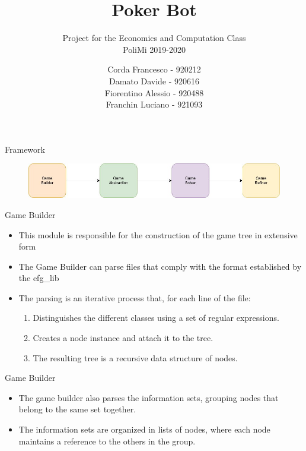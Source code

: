 \documentclass[11pt]{beamer}
\author{Corda Francesco - 920212\\
		Damato Davide - 920616\\
		Fiorentino Alessio - 920488\\
		Franchin Luciano - 921093}
\title{Poker Bot}
\subtitle{Project for the Economics and Computation Class\\
		PoliMi 2019-2020}
\begin{document}
\begin{frame}
\titlepage
\end{frame}


\begin{frame}{Framework}
\begin{figure}[hbtp]
		\centering
		\includegraphics[scale=0.5]{images/img_01.jpg}
		\end{figure}
\end{frame}

\begin{frame}{Game Builder}
\begin{itemize}
\item This module is responsible for the construction of the game tree in extensive form
\item The Game Builder can parse files that comply with the format established by the efg\_lib
\item The parsing is an iterative process that, for each line of the file:
\begin{enumerate}
\item Distinguishes the different classes using a set of regular expressions.
\item Creates a node instance and attach it to the tree.
\item The resulting tree is a recursive data structure of nodes.
\end{enumerate}
\end{itemize}
\end{frame}

\begin{frame}{Game Builder}
\begin{itemize}
\item The game builder also parses the information sets, grouping nodes that belong to the same set together.
\item The information sets are organized in lists of nodes, where each node maintains a reference to the others in the group.
\end{itemize}
\end{frame}
\end{document}
